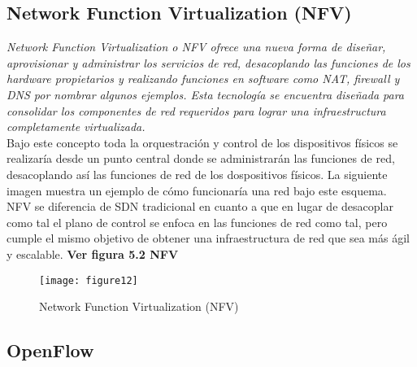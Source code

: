 \subsection{Network Function Virtualization (NFV)}
\label{sec:Network Function Virtualization (NFV)}

\textit{Network Function Virtualization o NFV ofrece una nueva forma de diseñar, aprovisionar y administrar los servicios de red, desacoplando las funciones de los hardware propietarios y realizando funciones en software como NAT, firewall y DNS por nombrar algunos ejemplos. Esta tecnología se encuentra diseñada para consolidar los componentes de red requeridos para lograr una infraestructura completamente virtualizada.}
\\
Bajo este concepto toda la orquestración y control de los dispositivos físicos se realizaría desde un punto central donde se administrarán las funciones de red, desacoplando así las funciones de red de los dospositivos físicos. La siguiente imagen muestra un ejemplo de cómo funcionaría una red bajo este esquema.
\\
NFV se diferencia de SDN tradicional en cuanto a que en lugar de desacoplar como tal el plano de control se enfoca en las funciones de red como tal, pero cumple el mismo objetivo de obtener una infraestructura de red que sea más ágil y escalable. \textbf{Ver figura 5.2 NFV}


\begin{figure}[htbp]
  \centering
    {\texttt{[image: figure12]}}%
  \caption{Network Function Virtualization (NFV)}
  \label{fig:fig2subfig}
\end{figure}

\subsection{OpenFlow}
\label{sec:OpenFlow}

